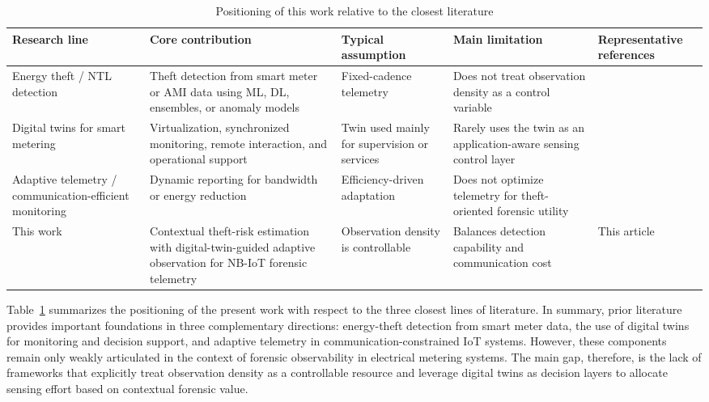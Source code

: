 \documentclass[journal]{IEEEtran}
\begin{document}
\begin{table}[!ht]
\centering
\caption{Positioning of this work relative to the closest literature}
\label{tab:rw_comparison}
\begin{tabular}{|p{2cm}|p{4.6cm}|p{2.4cm}|p{4.1cm}|p{1.9cm}|}
\hline
\textbf{Research line} & \textbf{Core contribution} & \textbf{Typical assumption} & \textbf{Main limitation} & \textbf{Representative references} \\
\hline
Energy theft / NTL detection & Theft detection from smart meter or AMI data using ML, DL, ensembles, or anomaly models & Fixed-cadence telemetry & Does not treat observation density as a control variable & \cite{b1,b2,b3,b4,b5,b6,b7,b8,b9,b10,b11,b12,b13,b14} \\
\hline
Digital twins for smart metering & Virtualization, synchronized monitoring, remote interaction, and operational support & Twin used mainly for supervision or services & Rarely uses the twin as an application-aware sensing control layer & \cite{b18,b19,b20,b21,b22,b23,b24,b25} \\
\hline
Adaptive telemetry / communication-efficient monitoring & Dynamic reporting for bandwidth or energy reduction & Efficiency-driven adaptation & Does not optimize telemetry for theft-oriented forensic utility & \cite{b26,b27,b28,b29,b30,b31} \\
\hline
This work & Contextual theft-risk estimation with digital-twin-guided adaptive observation for NB-IoT forensic telemetry & Observation density is controllable & Balances detection capability and communication cost & This article \\
\hline
\end{tabular}
\end{table}

Table~\ref{tab:rw_comparison} summarizes the positioning of the present work with respect to the three closest lines of literature. In summary, prior literature provides important foundations in three complementary directions: energy-theft detection from smart meter data, the use of digital twins for monitoring and decision support, and adaptive telemetry in communication-constrained IoT systems. However, these components remain only weakly articulated in the context of forensic observability in electrical metering systems. The main gap, therefore, is the lack of frameworks that explicitly treat observation density as a controllable resource and leverage digital twins as decision layers to allocate sensing effort based on contextual forensic value.
\end{document}
